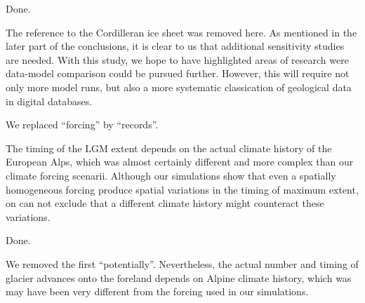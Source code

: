 
    Done.


    The reference to the Cordilleran ice sheet was removed here. As mentioned
    in the later part of the conclusions, it is clear to us that additional
    sensitivity studies are needed. With this study, we hope to have
    highlighted areas of research were data-model comparison could be pursued
    further. However, this will require not only more model runs, but also a
    more systematic classication of geological data in digital databases.


    We replaced ``forcing'' by ``records''.


    The timing of the LGM extent depends on the actual climate history of the
    European Alps, which was almost certainly different and more complex than
    our climate forcing scenarii.  Although our simulations show that even a
    spatially homogeneous forcing produce spatial variations in the timing of
    maximum extent, on can not exclude that a different climate history might
    counteract these variations.


    Done.


    We removed the first ``potentially''. Nevertheless, the actual number and
    timing of glacier advances onto the foreland depends on Alpine climate
    history, which was may have been very different from the forcing used in
    our simulations.


